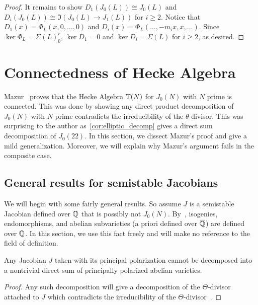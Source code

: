 \documentclass[11pt, proquest]{uwthesis}
\begin{document}
\begin{proof}
    It remains to show $D_1(J_0(L))\cong J_0(L)$ and $D_i(J_0(L))\cong
    \Im(J_0(L)\to J_1(L))$ for $i\geq 2$. Notice that
    $D_1(x)=\Phi_L(x,0,\ldots,0)$ and $D_i(x)=\Phi_L(\ldots,-m_ix,x,\ldots)$.
    Since $\ker\Phi_L=\Sigma(L)_0 ^r$, $\ker D_1=0$ and $\ker D_i=\Sigma(L)$
    for $i\geq 2$, as desired.
\end{proof}


\section{Connectedness of Hecke Algebra}%
\label{sec:connectedness_of_hecke_algebra}

Mazur~\cite[Prop. 10.6]{mazur:eisenstein} proves that the Hecke Algebra
$\mathbb{T}(N)$ for $J_0(N)$ with $N$ prime is connected. This was done by showing any
direct product decomposition of $J_0(N)$ with $N$ prime contradicts the
irreducibility of the $\theta$-divisor. This was surprising to the author
as~\ref{cor:elliptic_decomp} gives a direct sum decomposition of $J_0(22)$. In
this section, we dissect Mazur's proof and give a mild generalization.
Moreover, we will explain why Mazur's argument fails in the composite case. 

\subsection{General results for semistable Jacobians}

We will begin with some fairly general results. So assume $J$ is a semistable
Jacobian defined over $\mathbb{Q}$ that is possibly not $J_0(N)$. By~\cite[Corollary
1.4]{ribet:endo}, isogenies, endomorphisms, and abelian subvarieties (a priori
defined over $\overline{\mathbb{Q}}$) are defined over $\mathbb{Q}$. In this section, we use this
fact freely and will make no reference to the field of definition.

\begin{theorem}
    \label{thm:theta_irred}
    Any Jacobian $J$ taken with its principal polarization cannot be decomposed
    into a nontrivial direct sum of principally polarized abelian varieties.
\end{theorem}
\begin{proof}
    Any such decomposition will give a decomposition of the $\Theta$-divisor
    attached to $J$ which contradicts the irreducibility of the
    $\Theta$-divisor~\cite[\S 4(a)]{kempf:riemann}.
\end{proof}
\end{document}
